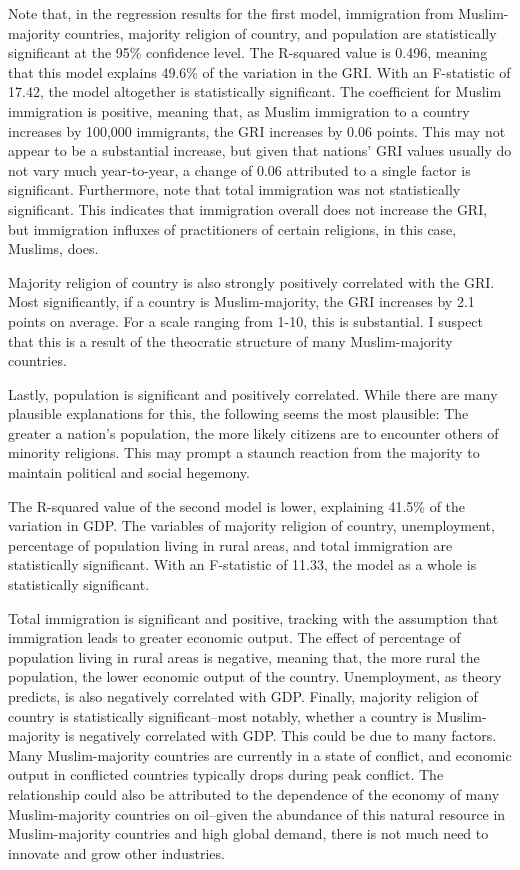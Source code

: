 \documentclass[12pt,english]{article}
\begin{document}
Note that, in the regression results for the first model, immigration from Muslim-majority countries, majority religion of country, and population are statistically significant at the 95\% confidence level. The R-squared value is 0.496, meaning that this model explains 49.6\% of the variation in the GRI. With an F-statistic of 17.42, the model altogether is statistically significant.
The coefficient for Muslim immigration is positive, meaning that, as Muslim immigration to a country increases by 100,000 immigrants, the GRI increases by 0.06 points. This may not appear to be a substantial increase, but given that nations' GRI values usually do not vary much year-to-year, a change of 0.06 attributed to a single factor is significant. Furthermore, note that total immigration was not statistically significant. This indicates that immigration overall does not increase the GRI, but immigration influxes of practitioners of certain religions, in this case, Muslims, does. 

Majority religion of country is also strongly positively correlated with the GRI. Most significantly, if a country is Muslim-majority, the GRI increases by 2.1 points on average. For a scale ranging from 1-10, this is substantial. I suspect that this is a result of the theocratic structure of many Muslim-majority countries.

Lastly, population is significant and positively correlated. While there are many plausible explanations for this, the following seems the most plausible: The greater a nation's population, the more likely citizens are to encounter others of minority religions. This may prompt a staunch reaction from the majority to maintain political and social hegemony.

The R-squared value of the second model is lower, explaining 41.5\% of the variation in GDP. The variables of majority religion of country, unemployment, percentage of population living in rural areas, and total immigration are statistically significant. With an F-statistic of 11.33, the model as a whole is statistically significant.

Total immigration is significant and positive, tracking with the assumption that immigration leads to greater economic output. The effect of percentage of population living in rural areas is negative, meaning that, the more rural the population, the lower economic output of the country. Unemployment, as theory predicts, is also negatively correlated with GDP. Finally, majority religion of country is statistically significant--most notably, whether a country is Muslim-majority is negatively correlated with GDP. This could be due to many factors. Many Muslim-majority countries are currently in a state of conflict, and economic output in conflicted countries typically drops during peak conflict. The relationship could also be attributed to the dependence of the economy of many Muslim-majority countries on oil--given the abundance of this natural resource in Muslim-majority countries and high global demand, there is not much need to innovate and grow other industries.
\end{document}
